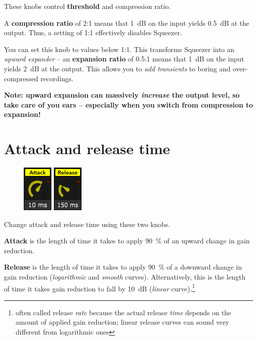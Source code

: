 These knobs control \textbf{threshold} and compression ratio.

A \textbf{compression ratio} of 2:1 means that \SI{1}{\dB} on the
input yields \SI{0.5}{\dB} at the output.  Thus, a setting of 1:1
effectively disables Squeezer.

You can set this knob to values below 1:1.  This transforms Squeezer
into an \emph{upward expander} -- an \textbf{expansion ratio} of 0.5:1
means that \SI{1}{\dB} on the input yields \SI{2}{\dB} at the output.
This allows you to \emph{add transients} to boring and over-compressed
recordings.

\textbf{Note: upward expansion can massively \emph{increase} the
  output level, so take care of you ears -- especially when you switch
  from compression to expansion!}

\section{Attack and release time}

\begin{figure}
  \includegraphics[scale=\screenshotscale,clip]{include/images/knob_attack_time.png}
  \includegraphics[scale=\screenshotscale,clip]{include/images/knob_release_time.png}
\end{figure}

Change attack and release time using these two knobs.

\textbf{Attack} is the length of time it takes to apply
\SI{90}{\percent} of an upward change in gain reduction.

\textbf{Release} is the length of time it takes to apply
\SI{90}{\percent} of a downward change in gain reduction
(\emph{logarithmic} and \emph{smooth} curves).  Alternatively, this is
the length of time it takes gain reduction to fall by \SI{10}{\dB}
(\emph{linear} curve).\footnote{often called release \emph{rate}
  because the actual release \emph{time} depends on the amount of
  applied gain reduction; linear release curves can sound very
  different from logarithmic ones}

